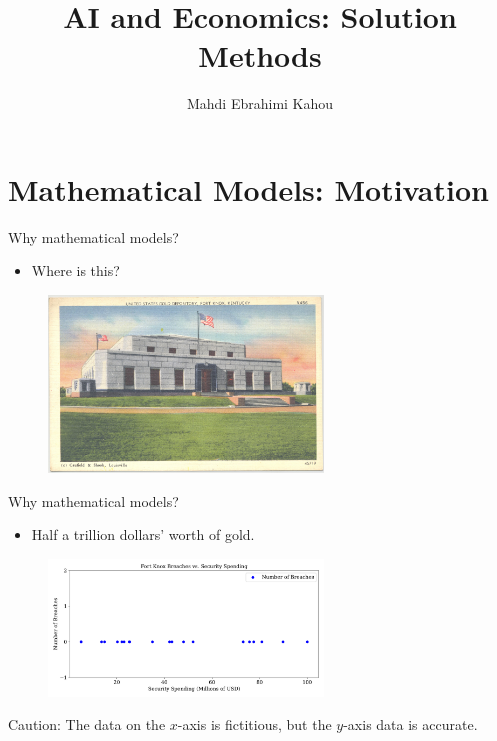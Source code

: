 \documentclass[aspectratio=169,10pt]{beamer}
\begin{document}
\title{{\vspace{0.4in}\hspace{0.2in}\textcolor{PennBlue}{AI and Economics: Solution Methods}}}
\author{\hspace*{4 mm} Mahdi Ebrahimi Kahou}



\date{}

\maketitle

\section{\textcolor{PennBlue}{Mathematical Models: Motivation}}

\begin{frame}{Why mathematical models?}
	\begin{itemize}
		\item Where is this?
	\end{itemize}
	\begin{figure}[t!]
		\centering
		\includegraphics[width=0.65\textwidth]{figs/Fortknox}
	\end{figure}
\end{frame}

\begin{frame}{Why mathematical models?}
	\begin{itemize}
		\item Half a trillion dollars’ worth of gold.
	\end{itemize}
	\begin{figure}[t!]
		\centering
		\includegraphics[width=0.65\textwidth]{figs/breaches}
	\end{figure}
	{\small Caution: The data on the $x$-axis is fictitious, but the $y$-axis data is accurate.}
\end{frame}
\end{document}
